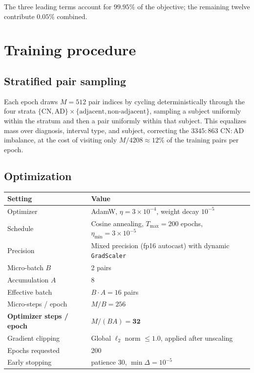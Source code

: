\documentclass[11pt]{article}
\begin{document}
\noindent The three leading terms account for $99.95\%$ of the objective; the remaining
twelve contribute $0.05\%$ combined.

\section{Training procedure}

\subsection{Stratified pair sampling}

Each epoch draws $M = 512$ pair indices by cycling deterministically through the four
strata $\{\mathrm{CN}, \mathrm{AD}\} \times \{\text{adjacent}, \text{non-adjacent}\}$,
sampling a subject uniformly within the stratum and then a pair uniformly within that
subject. This equalizes mass over diagnosis, interval type, and subject, correcting the
$3345\!:\!863$ CN$:$AD imbalance, at the cost of visiting only $M / 4208 \approx 12\%$ of
the training pairs per epoch.

\subsection{Optimization}

\begin{center}
\begin{tabular}{ll}
\toprule
Setting & Value \\
\midrule
Optimizer & AdamW, $\eta = 3\times 10^{-4}$, weight decay $10^{-5}$ \\
Schedule & Cosine annealing, $T_{\max} = 200$ epochs, $\eta_{\min} = 3\times10^{-5}$ \\
Precision & Mixed precision (fp16 autocast) with dynamic \texttt{GradScaler} \\
Micro-batch $B$ & 2 pairs \\
Accumulation $A$ & 8 \\
Effective batch & $B \cdot A = 16$ pairs \\
Micro-steps / epoch & $M / B = 256$ \\
\textbf{Optimizer steps / epoch} & $M / (B A) = \bm{32}$ \\
Gradient clipping & Global $\ell_2$ norm $\le 1.0$, applied after unscaling \\
Epochs requested & 200 \\
Early stopping & patience 30, $\min\Delta = 10^{-5}$ \\
\bottomrule
\end{tabular}
\end{center}
\end{document}
